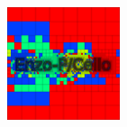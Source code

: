 \begin{frame}[fragile]
\begin{center}
\begin{minipage}{1.3in}
\end{minipage}
\begin{minipage}{1.3in}
\includegraphics[width=1.3in]{Images/Balance/balance-mesh-00008.png}
\end{minipage}
\end{center}
\end{frame}




